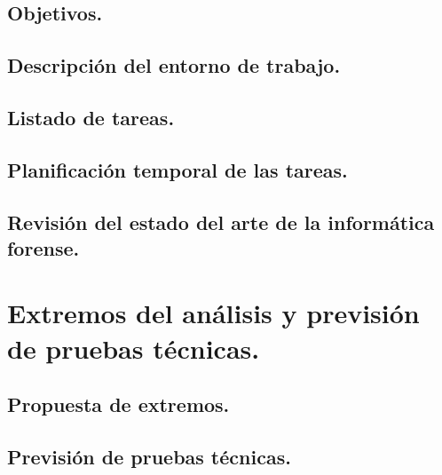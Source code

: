 \documentclass[12pt,a4paper]{report}
\begin{document}
\section{Objetivos.}
 

\section{Descripción del entorno de trabajo.}
 

\section{Listado de tareas.}
 

\section{Planificación temporal de las tareas.}
 

\section{Revisión del estado del arte de la informática forense.}
 

\chapter{Extremos del análisis y previsión de pruebas técnicas.}


\section{Propuesta de extremos.}


\section{Previsión de pruebas técnicas.}
 
\end{document}
